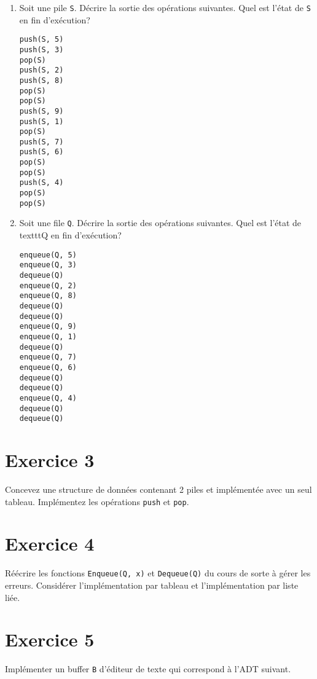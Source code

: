 \documentclass[a4paper,10pt]{article}
\begin{document}
\begin{enumerate}
\item Soit une pile \texttt{S}. Décrire la sortie des opérations suivantes. Quel est l'état de \texttt{S} en fin d'exécution?

\begin{verbatim}
push(S, 5)
push(S, 3)
pop(S)
push(S, 2)
push(S, 8)
pop(S)
pop(S)
push(S, 9)
push(S, 1)
pop(S)
push(S, 7)
push(S, 6)
pop(S)
pop(S)
push(S, 4)
pop(S)
pop(S)
\end{verbatim}

\item Soit une file \texttt{Q}. Décrire la sortie des opérations suivantes. Quel
est l'état de texttt{Q} en fin d'exécution?

\begin{verbatim}
enqueue(Q, 5)
enqueue(Q, 3)
dequeue(Q)
enqueue(Q, 2)
enqueue(Q, 8)
dequeue(Q)
dequeue(Q)
enqueue(Q, 9)
enqueue(Q, 1)
dequeue(Q)
enqueue(Q, 7)
enqueue(Q, 6)
dequeue(Q)
dequeue(Q)
enqueue(Q, 4)
dequeue(Q)
dequeue(Q)
\end{verbatim}

\end{enumerate}

\section*{Exercice 3}

Concevez une structure de données contenant 2 piles et implémentée avec un seul tableau. Implémentez les opérations \texttt{push} et \texttt{pop}.

\section*{Exercice 4}

Réécrire les fonctions \texttt{Enqueue(Q, x)} et \texttt{Dequeue(Q)} du cours de
sorte à gérer les erreurs. Considérer l'implémentation par tableau et
l'implémentation par liste liée.

\section*{Exercice 5}

Implémenter un buffer \texttt{B} d'éditeur de texte qui correspond à l'ADT suivant.
\end{document}
